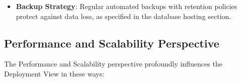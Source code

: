 \begin{itemize}



    \item \textbf{Backup Strategy}: Regular automated backups with retention policies protect against data loss, as specified in the database hosting section.

\end{itemize}

\subsection{Performance and Scalability Perspective}

The Performance and Scalability perspective profoundly influences the Deployment View in these ways:

